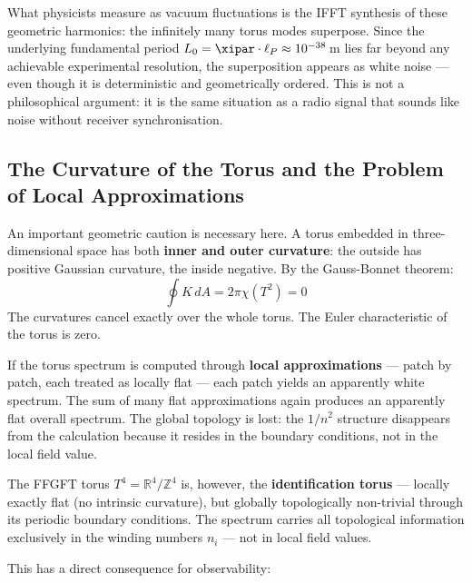 \begin{interpretation}
What physicists measure as vacuum fluctuations is the IFFT synthesis of these
geometric harmonics: the infinitely many torus modes superpose. Since the
underlying fundamental period $L_0 = \xipar \cdot \ell_P \approx 10^{-38}$\,m
lies far beyond any achievable experimental resolution, the superposition appears
as white noise — even though it is deterministic and geometrically ordered.
This is not a philosophical argument: it is the same situation as a radio signal
that sounds like noise without receiver synchronisation.
\end{interpretation}

\subsection{The Curvature of the Torus and the Problem of Local Approximations}

An important geometric caution is necessary here. A torus embedded in
three-dimensional space has both \textbf{inner and outer curvature}: the outside
has positive Gaussian curvature, the inside negative. By the Gauss-Bonnet theorem:
\begin{equation}
    \oint K \, dA = 2\pi \chi(T^2) = 0
\end{equation}
The curvatures cancel exactly over the whole torus. The Euler characteristic of
the torus is zero.

\begin{important}
If the torus spectrum is computed through \textbf{local approximations} —
patch by patch, each treated as locally flat — each patch yields an apparently
white spectrum. The sum of many flat approximations again produces an apparently
flat overall spectrum. The global topology is lost: the $1/n^2$ structure
disappears from the calculation because it resides in the boundary conditions,
not in the local field value.
\end{important}

The FFGFT torus $T^4 = \mathbb{R}^4/\mathbb{Z}^4$ is, however, the
\textbf{identification torus} — locally exactly flat (no intrinsic curvature),
but globally topologically non-trivial through its periodic boundary conditions.
The spectrum carries all topological information exclusively in the winding
numbers $n_i$ — not in local field values.

This has a direct consequence for observability:

